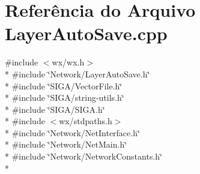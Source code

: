 \section{Referência do Arquivo Layer\+Auto\+Save.\+cpp}
\label{_layer_auto_save_8cpp}
{\ttfamily \#include $<$wx/wx.\+h$>$}\\*
{\ttfamily \#include \char`\"{}Network/\+Layer\+Auto\+Save.\+h\char`\"{}}\\*
{\ttfamily \#include \char`\"{}S\+I\+G\+A/\+Vector\+File.\+h\char`\"{}}\\*
{\ttfamily \#include \char`\"{}S\+I\+G\+A/string-\/utils.\+h\char`\"{}}\\*
{\ttfamily \#include \char`\"{}S\+I\+G\+A/\+S\+I\+G\+A.\+h\char`\"{}}\\*
{\ttfamily \#include $<$wx/stdpaths.\+h$>$}\\*
{\ttfamily \#include \char`\"{}Network/\+Net\+Interface.\+h\char`\"{}}\\*
{\ttfamily \#include \char`\"{}Network/\+Net\+Main.\+h\char`\"{}}\\*
{\ttfamily \#include \char`\"{}Network/\+Network\+Constants.\+h\char`\"{}}\\*
